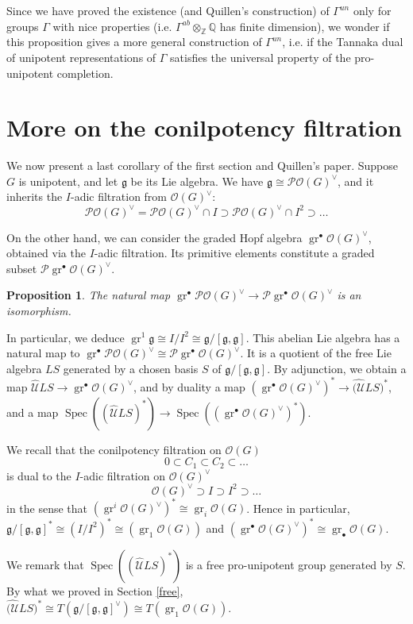 \documentclass{amsart}
\newtheorem{prop}[thm]{Proposition}
\theoremstyle{definition}
\theoremstyle{remark}
\theoremstyle{remark}
\newcommand{\Q}{\mathbb{Q}}
\newcommand{\Z}{\mathbb{Z}}
\newcommand{\ra}{\rightarrow}
\newcommand{\mcO}{\mathcal{O}}
\newcommand{\mcP}{\mathcal{P}}
\newcommand{\mcU}{\mathcal{U}}
\newcommand{\mfg}{\mathfrak{g}}
\DeclareMathOperator{\gr}{gr}
\DeclareMathOperator{\Spec}{Spec}
\begin{document}
Since we have proved the existence (and Quillen's construction) of $\Gamma^{un}$ only for groups $\Gamma$ with nice properties (i.e. $\Gamma^{ab}\otimes_\Z\Q$ has finite dimension), we wonder if this proposition gives a more general construction of $\Gamma^{un}$, i.e. if the Tannaka dual of unipotent representations of $\Gamma$ satisfies the universal property of the pro-unipotent completion.

\section{More on the conilpotency filtration}

We now present a last corollary of the first section and Quillen's paper. Suppose $G$ is unipotent, and let $\mfg$ be its Lie algebra. We have $\mfg\cong\mcP\mcO(G)^\vee$, and it inherits the $I$-adic filtration from $\mcO(G)^\vee$:
\[\mcP\mcO(G)^\vee=\mcP\mcO(G)^\vee\cap I\supset \mcP\mcO(G)^\vee\cap I^2\supset\ldots\]

On the other hand, we can consider the graded Hopf algebra $\gr^\bullet\mcO(G)^\vee$, obtained via the $I$-adic filtration. Its primitive elements constitute a graded subset $\mcP\gr^\bullet\mcO(G)^\vee$.

\begin{prop}\cite[Proposition A.2.14]{quillen-r}
The natural map $\gr^\bullet\mcP\mcO(G)^\vee\ra\mcP\gr^\bullet\mcO(G)^\vee$ is an isomorphism.
\end{prop}

In particular, we deduce $\gr^1\mfg\cong I/I^2\cong\mfg/[\mfg,\mfg]$. This abelian Lie algebra has a natural map to $\gr^\bullet\mcP\mcO(G)^\vee\cong\mcP\gr^\bullet\mcO(G)^\vee$. It is a quotient of the free Lie algebra $LS$ generated by a chosen basis $S$ of $\mfg/[\mfg,\mfg]$. By adjunction, we obtain a map $\hat{\mcU}LS\ra\gr^\bullet\mcO(G)^\vee$, and by duality a map $(\gr^\bullet\mcO(G)^\vee)^*\ra\hat{(\mcU}LS)^*$, and a map $\Spec((\hat{\mcU}LS)^*)\ra\Spec((\gr^\bullet\mcO(G)^\vee)^*)$.

We recall that the conilpotency filtration on $\mcO(G)$
\[
0\subset C_1\subset C_2\subset\ldots
\]
is dual to the $I$-adic filtration on $\mcO(G)^\vee$
\[
\mcO(G)^\vee\supset I\supset I^2\supset\ldots
\]
in the sense that $(\gr^i\mcO(G)^\vee)^*\cong\gr_i\mcO(G)$. Hence in particular, $\mfg/[\mfg,\mfg]^*\cong(I/I^2)^*\cong(\gr_1\mcO(G))$ and $(\gr^\bullet\mcO(G)^\vee)^*\cong\gr_\bullet\mcO(G)$.

We remark that $\Spec((\hat{\mcU}LS)^*)$ is a free pro-unipotent group generated by $S$. By what we proved in Section \ref{free}, $\hat{(\mcU}LS)^*\cong T(\mfg/[\mfg,\mfg]^\vee)\cong T(\gr_1\mcO(G))$.
\end{document}
